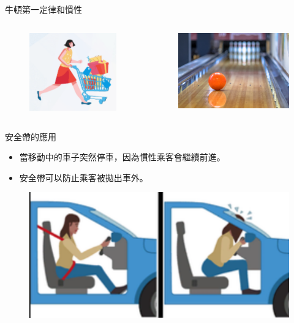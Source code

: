 \documentclass[beamer=true]{standalone}
\begin{document}
\begin{frame}{牛頓第一定律和慣性}
\begin{columns}
\begin{figure}[h!]
            \centering
            \includegraphics[width=.85\textwidth]{assets/b65bc2e1.png}
        \end{figure}
        \begin{figure}[h!]
            \centering
            \includegraphics[width=.85\textwidth]{assets/888883a6.png}
        \end{figure}
    \end{columns}

\end{frame}

\begin{frame}{安全帶的應用}
    \begin{itemize}
        \item 當移動中的車子突然停車，因為慣性乘客會繼續前進。
        \item 安全帶可以防止乘客被拋出車外。
    \end{itemize}
    \begin{figure}[h!]
        \centering
        \includegraphics[width=.5\textwidth]{assets/88ea2a86.png}
    \end{figure}
\end{frame}
\end{document}
